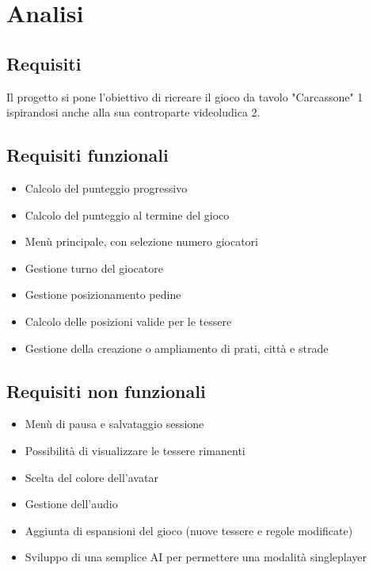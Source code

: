 \section{Analisi}
\subsection{Requisiti}
Il progetto si pone l'obiettivo di ricreare il gioco da tavolo "Carcassone" 1 ispirandosi anche alla sua controparte videoludica 2. 

\subsection*{Requisiti funzionali}
\begin{itemize}
\item Calcolo del punteggio progressivo
\item Calcolo del punteggio al termine del gioco
\item Menù principale, con selezione numero giocatori
\item Gestione turno del giocatore
\item Gestione posizionamento pedine
\item Calcolo delle posizioni valide per le tessere
\item Gestione della creazione o ampliamento di prati, città e strade
\end{itemize}

\subsection*{Requisiti non funzionali}
\begin{itemize}
\item Menù di pausa e salvataggio sessione
\item Possibilità di visualizzare le tessere rimanenti
\item Scelta del colore dell’avatar
\item Gestione dell’audio
\item Aggiunta di espansioni del gioco (nuove tessere e regole modificate)
\item Sviluppo di una semplice AI per permettere una modalità singleplayer
\end{itemize}

